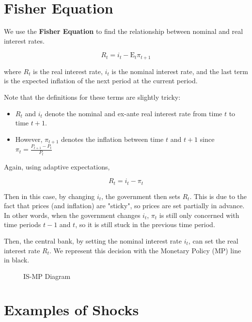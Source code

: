 \documentclass[11pt]{scrartcl}
\newcommand{\og}{\ensuremath{\tilde{Y}}}
\begin{document}
\section{Fisher Equation}

We use the \textbf{Fisher Equation} to find the relationship between nominal and real interest rates.

\[ R_t = i_t - \mathrm{E}_t \pi_{t+1} \] 

where $R_t$ is the real interest rate, $i_t$ is the nominal interest rate, and the last term is the expected inflation of the next period at the current period.

Note that the definitions for these terms are slightly tricky:

\begin{itemize}
\item $R_t$ and $i_t$ denote the nominal and ex-ante real interest rate from time $t$ to time $t+1$.
\item However, $\pi_{t+1}$ denotes the inflation between time $t$ and $t+1$ since $\pi_t = \frac{P_{t+1} - P_t}{P_t}$
\end{itemize}

Again, using adaptive expectations,

\[ R_t = i_t - \pi_t \] 

Then in this case, by changing $i_t$, the government then sets $R_t$. This is due to the fact that prices (and inflation) are "sticky", so prices are set partially in advance. In other words, when the government changes $i_t$, $\pi_t$ is still only concerned with time periods $t-1$ and $t$, so it is still stuck in the previous time period. 

Then, the central bank, by setting the nominal interest rate $i_t$, can set the real interest rate $R_t$. We represent this decision with the Monetary Policy (MP) line in black.

\begin{figure}[H]
\centering
{}
\caption{\color{blue}IS-\color{black}MP Diagram}
\end{figure}

\section{Examples of Shocks}
\end{document}
